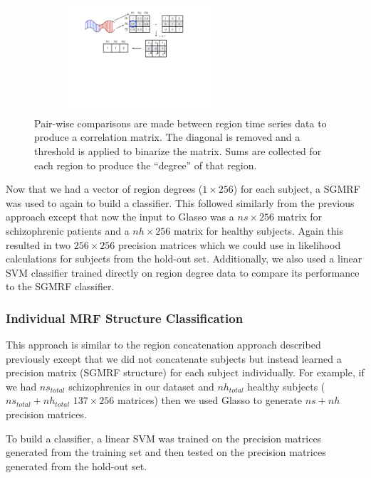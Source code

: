 \documentclass{article} %
\begin{document}
\begin{figure}[!htb]
  \centering
  \includegraphics[width=0.7\textwidth, height=4.0cm]{diagrams/ROI_deg_img.pdf}
  \caption{Pair-wise comparisons are made between region time series data to
  produce a correlation matrix. The diagonal is removed and a threshold is
  applied to binarize the matrix. Sums are collected for each region to
  produce the ``degree'' of that region.}
  \label{fig:degree_calc}
\end{figure}

Now that we had a vector of region degrees ($1 \times 256$) for each subject,
a SGMRF was used to again to build a classifier. This followed similarly from
the previous approach except that now the input to Glasso was a $ns \times 256$
matrix for schizophrenic patients and a $nh \times256$ matrix for healthy
subjects. Again this resulted in two $256 \times 256$ precision matrices which
we could use in likelihood calculations for subjects from the hold-out set.
Additionally, we also used a linear SVM classifier trained directly on
region degree data to compare its performance to the SGMRF classifier.


\subsubsection{Individual MRF Structure Classification}

This approach is similar to the region concatenation approach described 
previously except that we did not concatenate subjects but instead
learned a precision matrix (SGMRF structure) for each subject 
individually. For example, if we had $ns_{total}$ schizophrenics in our 
dataset and $nh_{total}$ healthy subjects ($ns_{total} + nh_{total}$ 
$137 \times 256$ matrices) then we used Glasso to generate $ns + nh$ 
precision matrices.

To build a classifier, a linear SVM was trained on the precision matrices 
generated from the training set and then tested on the precision matrices 
generated from the hold-out set.
\end{document}
